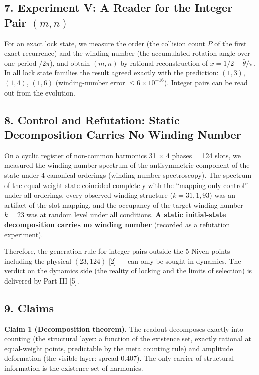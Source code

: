 \documentclass[
  a4paper,
]{article}
\begin{document}
\subsection{\texorpdfstring{7. Experiment V: A Reader for the Integer
Pair
\((m,n)\)}{7. Experiment V: A Reader for the Integer Pair (m,n)}}\label{experiment-v-a-reader-for-the-integer-pair-mn}

For an exact lock state, we measure the order (the collision count \(P\)
of the first exact recurrence) and the winding number (the accumulated
rotation angle over one period \(/2\pi\)), and obtain \((m,n)\) by
rational reconstruction of \(x=1/2-\bar\theta/\pi\). In all lock state
families the result agreed exactly with the prediction: \((1,3)\),
\((1,4)\), \((1,6)\) (winding-number error \(\le6\times10^{-16}\)).
Integer pairs can be read out from the evolution.

\subsection{8. Control and Refutation: Static Decomposition Carries No
Winding
Number}\label{control-and-refutation-static-decomposition-carries-no-winding-number}

On a cyclic register of non-common harmonics 31 × 4 phases = 124 slots,
we measured the winding-number spectrum of the antisymmetric component
of the state under 4 canonical orderings (winding-number spectroscopy).
The spectrum of the equal-weight state coincided completely with the
``mapping-only control'' under all orderings, every observed winding
structure (\(k=31,1,93\)) was an artifact of the slot mapping, and the
occupancy of the target winding number \(k=23\) was at random level
under all conditions. \textbf{A static initial-state decomposition
carries no winding number} (recorded as a refutation experiment).

Therefore, the generation rule for integer pairs outside the 5 Niven
points --- including the physical \((23,124)\) {[}2{]} --- can only be
sought in dynamics. The verdict on the dynamics side (the reality of
locking and the limits of selection) is delivered by Part III {[}5{]}.

\subsection{9. Claims}\label{claims}

\textbf{Claim 1 (Decomposition theorem).} The readout decomposes exactly
into counting (the structural layer: a function of the existence set,
exactly rational at equal-weight points, predictable by the meta
counting rule) and amplitude deformation (the visible layer: spread
0.407). The only carrier of structural information is the existence set
of harmonics.
\end{document}
